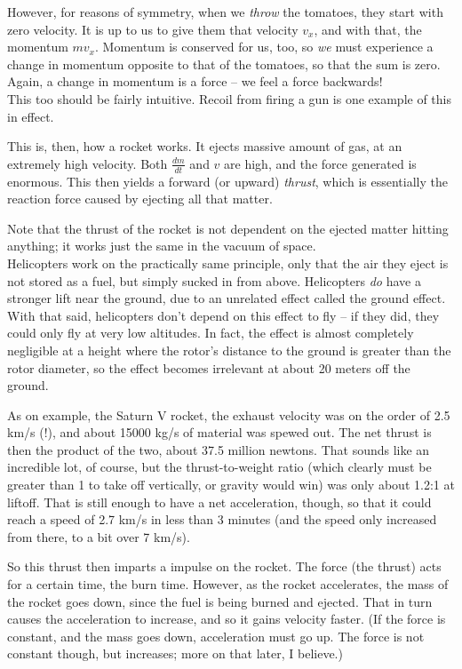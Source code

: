 However, for reasons of symmetry, when we \emph{throw} the tomatoes, they start with zero velocity. It is up to us to give them that velocity $v_x$, and with that, the momentum $m v_x$. Momentum is conserved for us, too, so \emph{we} must experience a change in momentum opposite to that of the tomatoes, so that the sum is zero. Again, a change in momentum is a force -- we feel a force backwards!\\
This too should be fairly intuitive. Recoil from firing a gun is one example of this in effect.

This is, then, how a rocket works. It ejects massive amount of gas, at an extremely high velocity. Both $\displaystyle \frac{dm}{dt}$ and $v$ are high, and the force generated is enormous. This then yields a forward (or upward) \emph{thrust}, which is essentially the reaction force caused by ejecting all that matter.

Note that the thrust of the rocket is not dependent on the ejected matter hitting anything; it works just the same in the vacuum of space.\\
Helicopters work on the practically same principle, only that the air they eject is not stored as a fuel, but simply sucked in from above. Helicopters \emph{do} have a stronger lift near the ground, due to an unrelated effect called the ground effect. With that said, helicopters don't depend on this effect to fly -- if they did, they could only fly at very low altitudes. In fact, the effect is almost completely negligible at a height where the rotor's distance to the ground is greater than the rotor diameter, so the effect becomes irrelevant at about 20 meters off the ground.

As on example, the Saturn V rocket, the exhaust velocity was on the order of 2.5 km/s (!), and about 15000 kg/s of material was spewed out. The net thrust is then the product of the two, about 37.5 million newtons. That sounds like an incredible lot, of course, but the thrust-to-weight ratio (which clearly must be greater than 1 to take off vertically, or gravity would win) was only about 1.2:1 at liftoff. That is still enough to have a net acceleration, though, so that it could reach a speed of 2.7 km/s in less than 3 minutes (and the speed only increased from there, to a bit over 7 km/s).

So this thrust then imparts a impulse on the rocket. The force (the thrust) acts for a certain time, the burn time. However, as the rocket accelerates, the mass of the rocket goes down, since the fuel is being burned and ejected. That in turn causes the acceleration to increase, and so it gains velocity faster. (If the force is constant, and the mass goes down, acceleration must go up. The force is not constant though, but increases; more on that later, I believe.)

